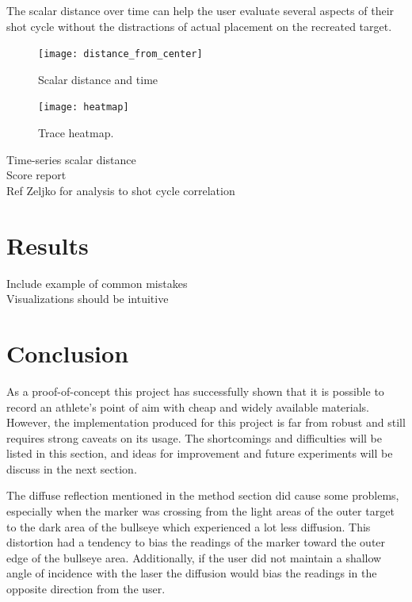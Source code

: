 \documentclass[conference]{IEEEtran}
\begin{document}
The scalar distance over time can help the user evaluate several aspects of their shot cycle without the distractions of actual placement on the recreated target.


\begin{figure}[]
	\centering
	\texttt{[image: distance\_from\_center]}
	\caption{Scalar distance and time}
	\label{fig:dfc}
\end{figure}


\begin{figure}[]
	\centering
	\texttt{[image: heatmap]}
	\caption{Trace heatmap.}
	\label{fig:heatmap}
\end{figure}



\textlangle Time-series scalar distance \textrangle \\
\textlangle Score report \textrangle \\
\textlangle Ref Zeljko for analysis to shot cycle correlation \textrangle

\section{Results}

\noindent
\textlangle Include example of common mistakes \textrangle \\
\textlangle Visualizations should be intuitive \textrangle

\section{Conclusion}

As a proof-of-concept this project has successfully shown that it is possible to record an athlete's point of aim with cheap and widely available materials.
However, the implementation produced for this project is far from robust and still requires strong caveats on its usage.
The shortcomings and difficulties will be listed in this section, 
and ideas for improvement and future experiments will be discuss in the next section.

The diffuse reflection mentioned in the method section did cause some problems, especially when the marker was crossing from the light areas of the outer target to the dark area of the bullseye which experienced a lot less diffusion.
This distortion had a tendency to bias the readings of the marker toward the outer edge of the bullseye area.
Additionally, if the user did not maintain a shallow angle of incidence with the laser the diffusion would bias the readings in the opposite direction from the user.
\end{document}

